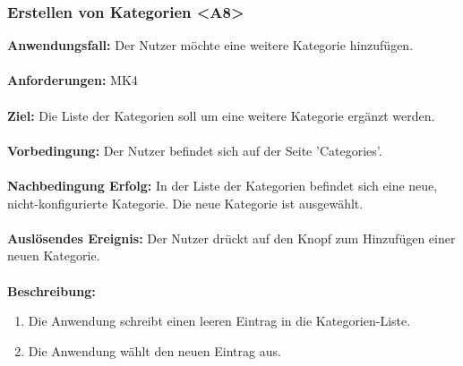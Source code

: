 \documentclass[parskip=full]{scrartcl} %
\begin{document}
\subsubsection*{Erstellen von Kategorien <A8>}
\textbf{Anwendungsfall:} Der Nutzer möchte eine weitere Kategorie hinzufügen.\\\\
\textbf{Anforderungen:} MK4\\\\
\textbf{Ziel:} Die Liste der Kategorien soll um eine weitere Kategorie ergänzt werden. \\\\
\textbf{Vorbedingung:} Der Nutzer befindet sich auf der Seite 'Categories'. \\\\
\textbf{Nachbedingung Erfolg:} In der Liste der Kategorien befindet sich eine neue, nicht-konfigurierte Kategorie. Die neue Kategorie ist ausgewählt.\\\\
\textbf{Auslösendes Ereignis:} Der Nutzer drückt auf den Knopf zum Hinzufügen einer neuen Kategorie. \\\\
\textbf{Beschreibung:}
\begin{enumerate}
    \item Die Anwendung schreibt einen leeren Eintrag in die Kategorien-Liste.
    \item Die Anwendung wählt den neuen Eintrag aus.
\end{enumerate}
\newpage
\end{document}
